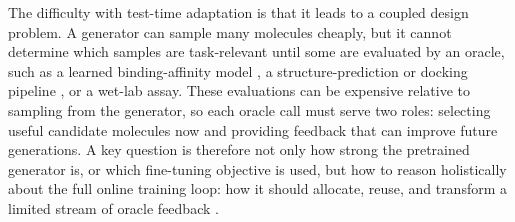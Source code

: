 The difficulty with  test-time adaptation is that it leads to a coupled design problem. A generator can sample many molecules cheaply, but it cannot determine which samples are task-relevant until some are evaluated by an oracle, such as a learned binding-affinity model \citep{jiangFlashAffinityBridgingAccuracySpeed}, a structure-prediction or docking pipeline \citep{passaro2025boltz2}, or a wet-lab assay. These evaluations can be expensive relative to sampling from the generator, so each oracle call must serve two roles: selecting useful candidate molecules now and providing feedback that can improve future generations. A key question is therefore not only how strong the pretrained generator is, or which fine-tuning objective is used, but how to reason holistically about the full online training loop: how it should allocate, reuse, and transform a limited stream of oracle feedback \citep{didi2026scaling}.



